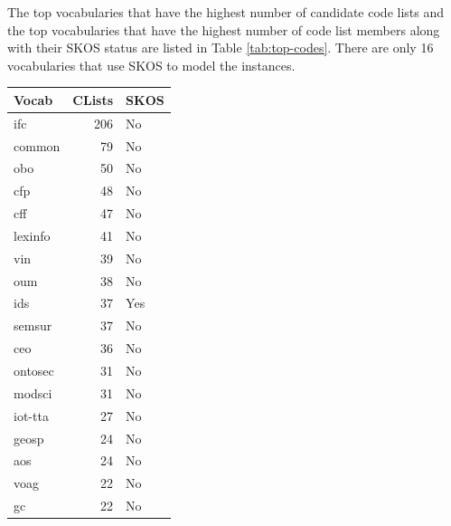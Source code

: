 The top vocabularies that have the highest number of candidate code lists and the top vocabularies that have the highest number of code list members along with their SKOS status are listed in Table \ref{tab:top-codes}. There are only 16 vocabularies that use SKOS to model the instances.

\begin{table}[h]
\footnotesize
\begin{tabular}{|l|r|l|}
\hline
\textbf{Vocab} & \textbf{CLists} & \textbf{SKOS} \\ \hline
ifc       & 206         & No   \\ \hline
common    & 79          & No   \\ \hline
obo       & 50          & No   \\ \hline
cfp       & 48          & No   \\ \hline
cff       & 47          & No   \\ \hline
lexinfo   & 41          & No   \\ \hline
vin       & 39          & No   \\ \hline
oum       & 38          & No   \\ \hline
ids       & 37          & Yes  \\ \hline
semsur    & 37          & No   \\ \hline
ceo       & 36          & No   \\ \hline
ontosec   & 31          & No   \\ \hline
modsci    & 31          & No   \\ \hline
iot-tta   & 27          & No   \\ \hline
geosp     & 24          & No   \\ \hline
aos       & 24          & No   \\ \hline
voag      & 22          & No   \\ \hline
gc        & 22          & No   \\ \hline

\end{tabular}
\end{table}
